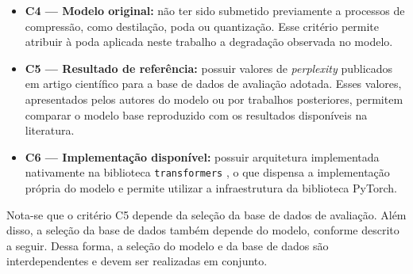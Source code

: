 \begin{itemize}
          estimativa mínima, 16 bytes por parâmetro para armazenar pesos, gradientes e
          estados do otimizador \cite{Rajbhandari2020}. Além disso, as ativações também
          ocupam memória, o que torna essa estimativa um limite inferior. No ambiente
          adotado, a GPU NVIDIA Tesla T4, disponibilizada pela plataforma Kaggle, possui 16
          GB de memória \cite{NVIDIA2019T4}. Assim, esse critério restringe os candidatos a
          modelos com menos de aproximadamente 1 bilhão de parâmetros, considerando que a
          memória necessária para armazenar as ativações reduz esse limite.
    \item \textbf{C4 --- Modelo original:} não ter sido submetido previamente a processos de
          compressão, como destilação, poda ou quantização. Esse critério permite atribuir
          à poda aplicada neste trabalho a degradação observada no modelo.
    \item \textbf{C5 --- Resultado de referência:} possuir valores de \textit{perplexity}
          publicados em artigo científico para a base de dados de avaliação adotada. Esses
          valores, apresentados pelos autores do modelo ou por trabalhos posteriores,
          permitem comparar o modelo base reproduzido com os resultados disponíveis na
          literatura.
    \item \textbf{C6 --- Implementação disponível:} possuir arquitetura implementada
          nativamente na biblioteca \texttt{transformers} \cite{Wolf2020}, o que dispensa a
          implementação própria do modelo e permite utilizar a infraestrutura da biblioteca
          PyTorch.
\end{itemize}


Nota-se que o critério C5 depende da seleção da base de dados de avaliação. Além disso, a
seleção da base de dados também depende do modelo, conforme descrito a seguir.
Dessa forma, a seleção do modelo e da base de dados são
interdependentes e devem ser realizadas em conjunto.

